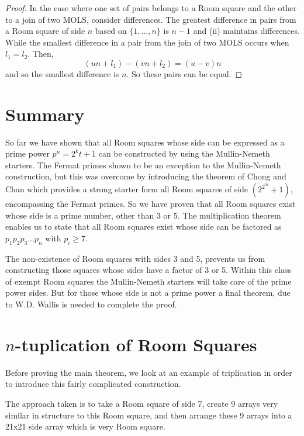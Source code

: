 \begin{proof}
In the case where one set of pairs belongs to a Room square and the other to a join of two MOLS, consider differences.
The greatest difference in pairs from a Room square of side $n$ based on $\{1, \ldots, n\}$ is $n - 1$ and (ii) maintains differences.
While the smallest difference in a pair from the join of two MOLS occurs when $l_1 = l_2$.
Then,
\begin{equation}
  (un + l_1) - (vn + l_2) = (u - v)n
\end{equation}
and so the smallest difference is $n$.
So these pairs can be equal.
\end{proof}

\section{Summary}

So far we have shown that all Room squares whose side can be expressed as a prime power $p^n = 2^kt + 1$ can be constructed by using the Mullin-Nemeth starters.
The Fermat primes shown to be an exception to the Mullin-Nemeth construction, but this was overcome by introducing the theorem of Chong and Chan which provides a strong starter form all Room squares of side $(2^{2^m} + 1)$, encompassing the Fermat primes.
So we have proven that all Room squares exist whose side is a prime number, other than 3 or 5.
The multiplication theorem enables us to state that all Room squares exist whose side can be factored as $p_1p_2p_3...p_n$ with $p_i \geq 7$.

The non-existence of Room squares with sides 3 and 5, prevents us from constructing those squares whose sides have a factor of 3 or 5.
Within this class of exempt Room squares the Mullin-Nemeth starters will take care of the prime power sides.
But for those whose side is not a prime power a final theorem, due to W.D. Wallis is needed to complete the proof.

\section{$n$-tuplication of Room Squares}

Before proving the main theorem, we look at an example of triplication in order to introduce this fairly complicated construction.

The approach taken is to take a Room square of side 7, create 9 arrays very similar in structure to this Room square, and then arrange these 9 arrays into a 21x21 side array which is very Room square.  

